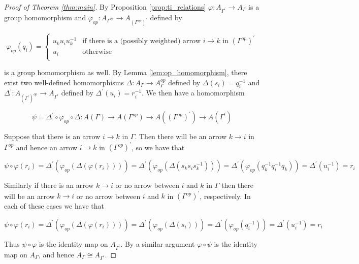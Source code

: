 \documentclass[11pt]{amsart}
\theoremstyle{definition}
\begin{document}
\begin{proof}[Proof of Theorem \ref{thm:main}]
By Proposition \ref{prop:ti_relations} $\varphi\colon A_{\Gamma^\prime}\rightarrow A_\Gamma$ is a group homomorphism and $\varphi_{op}\colon A_{\Gamma^{op}}\rightarrow A_{\left(\Gamma^{op}\right)^\prime}$ defined by

\begin{displaymath}
\varphi_{op}(q_i) = \begin{cases}    u_ku_iu_k^{-1} & \mbox{if there is a (possibly weighted) arrow } i \rightarrow k \mbox{ in } \left(\Gamma^{op}\right)^\prime\\
				u_i & \mbox{otherwise}\\
	\end{cases}
\end{displaymath}

\noindent is a group homomorphism as well.  By Lemma \ref{lem:op_homomorphism}, there exist two well-defined homomorphisms $\Delta\colon A_{\Gamma}\rightarrow A_\Gamma^{op}$ defined by $\Delta(s_i) = q_i^{-1}$ and $\Delta^\prime\colon A_{\left(\Gamma^\prime\right)^{op}} \rightarrow A_{\Gamma^\prime}$ defined by $\Delta^\prime(u_i) = r_i^{-1}$. We then have a homomorphism 

$$\psi = \Delta^\prime\circ\varphi_{op}\circ\Delta\colon A(\Gamma)\rightarrow A(\Gamma^{op})\rightarrow A(\left(\Gamma^{op}\right)^{\prime}) \rightarrow A(\Gamma^{\prime})$$

Suppose that there is an arrow $i\rightarrow k$ in $\Gamma$. Then there will be an arrow $k\rightarrow i$ in $\Gamma^{op}$ and hence an arrow $i\rightarrow k$ in $\left(\Gamma^{op}\right)^{\prime}$, so we have that

$$\psi\circ\varphi(r_i) = \Delta^\prime(\varphi_{op}(\Delta(\varphi(r_i)))) = \Delta^\prime(\varphi_{op}(\Delta(s_ks_is_k^{-1}))) = \Delta^\prime(\varphi_{op}(q_k^{-1}q_i^{-1}q_k)) = \Delta^\prime(u_i^{-1}) = r_i$$

Similarly if there is an arrow $k\rightarrow i$ or no arrow between $i$ and $k$ in $\Gamma$ then there will be an arrow $k\rightarrow i$ or no arrow between $i$ and $k$ in $\left(\Gamma^{op}\right)^{\prime}$, respectively. In each of these cases we have that

$$\psi\circ\varphi(r_i) = \Delta^\prime(\varphi_{op}(\Delta(\varphi(r_i)))) = \Delta^\prime(\varphi_{op}(\Delta(s_i))) = \Delta^\prime(\varphi_{op}(q_i^{-1})) = \Delta^\prime(u_i^{-1}) = r_i$$

Thus $\psi\circ\varphi$ is the identity map on $A_{\Gamma^{\prime}}$.  By a similar argument $\varphi\circ\psi$ is the identity map on $A_\Gamma$, and hence $A_\Gamma\cong A_{\Gamma^{\prime}}$.
\end{proof}
\end{document}
